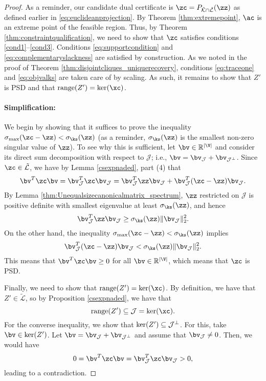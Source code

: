 \begin{proof}
As a reminder, our candidate dual certificate is $\zc = P_{\tilde{\mathcal{K}} \cap\tilde{\mathcal{L}}} (\zz)$ as defined earlier in \eqref{eq:euclideanprojection}.  By Theorem \ref{thm:extremepoint}, $\ac$ is an extreme point of the feasible region.  Thus, by  Theorem \ref{thm:constraintqualification}, we need to show that $\zc$ satisfies conditions \eqref{cond1}--\eqref{cond3}.  Conditions \eqref{eq:supportcondition} and \eqref{eq:complementaryslackness} are satisfied by construction.  As we noted in the proof of Theorem \ref{thm:disjointcliques_uniquerecovery}, conditions \eqref{eq:traceone} and   \eqref{eq:objvalks} are taken care of by scaling.  As such, it remains to show that $Z'$ is PSD and that ${\rm range}(Z')={\rm ker}(\xc)$.


\paragraph{Simplification:}  We begin by showing that it suffices to prove the inequality $\sigma_{\max}(\zc - \zz) < \sigma_{\ks}(\zz)$ (as a reminder, $\sigma_{\ks}(\zz)$ is the smallest non-zero singular value of $\zz$).  To see why this is sufficient, let $\bv \in \mathbb{R}^{|\V|}$ and consider its direct sum decomposition with respect to $\mathcal{J}$; i.e., $\bv = \bv_{\mathcal{J}} + \bv_{\mathcal{J}^\perp}$.  Since $\zc \in \tilde{\mathcal{L}}$, we have by Lemma \ref{csexpnaded}, part (4) that   
$$
\bv^{T} \zc \bv = \bv^{T}_{\mathcal{J}} \zc \bv_{\mathcal{J}} = \bv^{T}_{\mathcal{J}} \zz \bv_{\mathcal{J}} + \bv^{T}_{\mathcal{J}} (\zc - \zz) \bv_{\mathcal{J}}.
$$
By Lemma \ref{thm:Unequalsizecanonicalmatrix_spectrum}, $\zz$ restricted on $\mathcal{J}$ is positive definite with smallest eigenvalue at least $\sigma_{\ks}(\zz)$, and hence 
$$
\bv^{T}_{\mathcal{J}} \zz \bv_{\mathcal{J}} \geq \sigma_{\ks}(\zz) \|\bv_{\mathcal{J}}\|_2^2.
$$
On the other hand, the inequality $\sigma_{\max}(\zc-\zz) < \sigma_{\ks}(\zz)$ implies
$$\bv^{T}_{\mathcal{J}} (\zc - \zz) \bv_{\mathcal{J}} <  \sigma_{\ks}(\zz) \|\bv_{\mathcal{J}}\|_2^2.$$
This means that $\bv^{T} \zc \bv \geq 0$ for all $\bv \in \mathbb{R}^{|\V|}$, which means that $\zc$ is PSD.  
  
Finally, we need to show that  ${\rm range}(Z')={\rm ker}(\xc)$. By definition, we have that $Z'\in \tilde{\mathcal{L}}$, so by Proposition \ref{csexpnaded}, we have that 
  $$ {\rm range}(Z')\subseteq \mathcal{J}={\rm ker}(\xc).$$
  For the converse inequality, we show that ${\rm ker}(Z')\subseteq \mathcal{J}^\perp$. For this, take $\bv\in {\rm ker}(Z')$. Let  $\bv = \bv_{\mathcal{J}} + \bv_{\mathcal{J}^\perp}$ and assume  that $\bv_{\mathcal{J}} \ne 0$. Then,  we would have
  $$0=\bv^{T} \zc \bv =\bv^{T}_{\mathcal{J}} \zc \bv_{\mathcal{J}}>0,$$
  leading to a contradiction. 
  

\end{proof}
